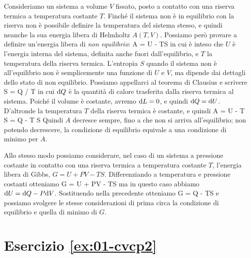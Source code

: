 Consideriamo un sistema a volume $V$ fissato, posto a contatto con una riserva termica a temperatura costante $T$. Finché il sistema non è in equilibrio con la riserva non è possibile definire la temperatura del sistema stesso, e quindi neanche la sua energia libera di Helmholtz $A(T,V)$. Possiamo però provare a definire un'energia libera di {\em non equilibrio}:
\be
A = U - TS
\ee
in cui è inteso che $U$ è l'energia interna del sistema, definita anche fuori dall'equilibrio, e $T$ la temperatura della riserva termica. L'entropia $S$ quando il sistema non è all'equilibrio non è semplicemente una funzione di $U$ e $V$, ma dipende dai dettagli dello stato di non equilibrio. Possiamo appellarci al teorema di Clausius e scrivere
\be
\de S = \ge \de Q / T
\ee
in cui ${\textrm d}Q$ è la quantità di calore trasferita dalla riserva termica al sistema. Poiché il volume è costante, avremo ${\textrm d}L = 0$, e quindi ${\textrm d}Q = {\textrm d}U$. D'altronde la temperatura $T$ della riserva termica è costante, e quindi
\be
\de A = \de U - T \de S = \de Q - T \de S 
\ee
Quindi $A$ decresce sempre, fino a che non si arriva all'equilibrio; non potendo decrescere, la condizione di equilibrio equivale a una condizione di minimo per $A$.

Allo stesso modo possiamo considerare, nel caso di un sistema a pressione costante in contatto con una riserva termica a temperatura costante $T$, l'energia libera di Gibbs, $G = U + PV - TS$. Differenziando a temperatura e pressione costanti otteniamo
\be
\de G = \de U + P\de V - T\de S
\ee
ma in questo caso abbiamo ${\textrm d}U = {\textrm d}Q - P{\textrm d}V$. Sostituendo nella precedente otteniamo
\be
\de G = \de Q - T\de S 
\ee
e possiamo svolgere le stesse considerazioni di prima circa la condizione di equilibrio e quella di minimo di $G$.

%
%
\section*{Esercizio \ref{ex:01-cvcp2}}

